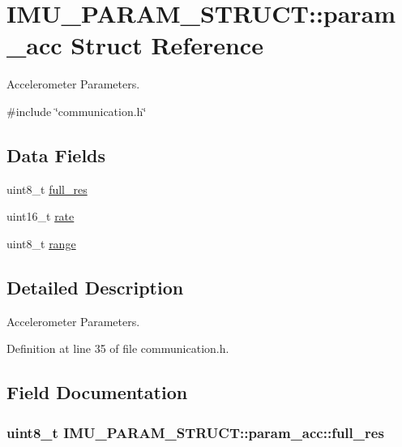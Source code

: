 \hypertarget{structIMU__PARAM__STRUCT_1_1param__acc}{
\section{IMU\_\-PARAM\_\-STRUCT::param\_\-acc Struct Reference}
\label{structIMU__PARAM__STRUCT_1_1param__acc}
}


Accelerometer Parameters.  




{\ttfamily \#include \char`\"{}communication.h\char`\"{}}

\subsection*{Data Fields}
\begin{DoxyCompactItemize}
\item 
uint8\_\-t \hyperlink{structIMU__PARAM__STRUCT_1_1param__acc_af57da5d956ffa7e49a184326b6b9c738}{full\_\-res}
\item 
uint16\_\-t \hyperlink{structIMU__PARAM__STRUCT_1_1param__acc_a30e6a318cad098cd8379416705820f95}{rate}
\item 
uint8\_\-t \hyperlink{structIMU__PARAM__STRUCT_1_1param__acc_a26199b298ef2d353192dfbc706bce8cf}{range}
\end{DoxyCompactItemize}


\subsection{Detailed Description}
Accelerometer Parameters. 

Definition at line 35 of file communication.h.



\subsection{Field Documentation}
\hypertarget{structIMU__PARAM__STRUCT_1_1param__acc_af57da5d956ffa7e49a184326b6b9c738}{
\subsubsection[{full\_\-res}]{\setlength{\rightskip}{0pt plus 5cm}uint8\_\-t {\bf IMU\_\-PARAM\_\-STRUCT::param\_\-acc::full\_\-res}}}
\label{structIMU__PARAM__STRUCT_1_1param__acc_af57da5d956ffa7e49a184326b6b9c738}


